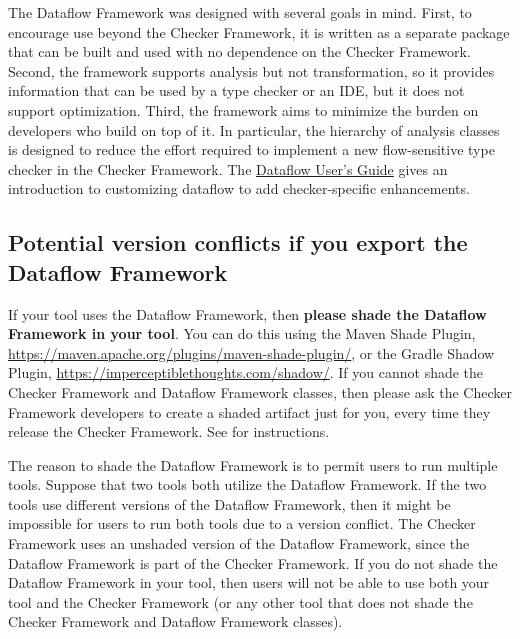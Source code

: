 The Dataflow Framework was
designed with several goals in mind.  First, to encourage use
beyond the Checker Framework, it is written as a separate package that can be
built and used with no dependence on the Checker Framework.  Second,
the framework supports analysis but not
transformation, so it provides information that can be used by a type
checker or an IDE, but it does not support optimization.  Third, the
framework aims to minimize the burden on developers who build on top
of it.  In particular, the hierarchy of analysis classes is designed
to reduce the effort required to implement a new flow-sensitive type
checker in the Checker Framework. The
\href{https://docs.google.com/document/d/1oYzbOrrS4ZEEx4wQgIHbijNzcI5CiQAq_-1NrOS8JME/edit?usp=sharing}{Dataflow User's Guide}
gives an introduction to customizing dataflow to add checker-specific
enhancements.



\subsection{Potential version conflicts if you export the Dataflow Framework}

If your tool uses the Dataflow Framework, then \textbf{please shade the
  Dataflow Framework in your tool}.  You can do this using the Maven Shade
Plugin, \url{https://maven.apache.org/plugins/maven-shade-plugin/}, or the
Gradle Shadow Plugin, \url{https://imperceptiblethoughts.com/shadow/}.
If you cannot shade the Checker Framework and Dataflow Framework classes, then
please ask the Checker Framework developers to create a shaded artifact
just for you, every time they release the Checker Framework.
See  for instructions.

The reason to shade the Dataflow Framework is to permit users to run multiple tools.
Suppose that two tools both utilize the Dataflow Framework.
If the two tools use different versions of the Dataflow Framework,
then it might be impossible for users to run both tools due to a version conflict.
The Checker Framework uses an unshaded version of the Dataflow Framework,
since the Dataflow Framework is part of the Checker Framework.
If you do not shade the Dataflow Framework in your tool, then users will
not be able to use both your tool and the Checker Framework (or any other
tool that does not shade the Checker Framework and Dataflow Framework classes).


